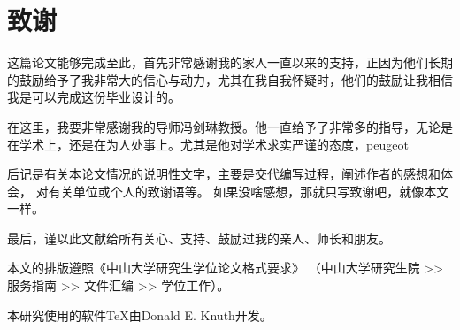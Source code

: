 
\chapter{致谢}

这篇论文能够完成至此，首先非常感谢我的家人一直以来的支持，正因为他们长期的鼓励给予了我非常大的信心与动力，尤其在我自我怀疑时，他们的鼓励让我相信我是可以完成这份毕业设计的。

在这里，我要非常感谢我的导师冯剑琳教授。他一直给予了非常多的指导，无论是在学术上，还是在为人处事上。尤其是他对学术求实严谨的态度，peugeot


后记是有关本论文情况的说明性文字，主要是交代编写过程，阐述作者的感想和体会，
对有关单位或个人的致谢语等。
如果没啥感想，那就只写致谢吧，就像本文一样。

最后，谨以此文献给所有关心、支持、鼓励过我的亲人、师长和朋友。\nopagebreak

本文的排版遵照《中山大学研究生学位论文格式要求》
（中山大学研究生院 >> 服务指南 >> 文件汇编 >>  学位工作）。

本研究使用的软件\TeX{}由Donald E. Knuth开发。
